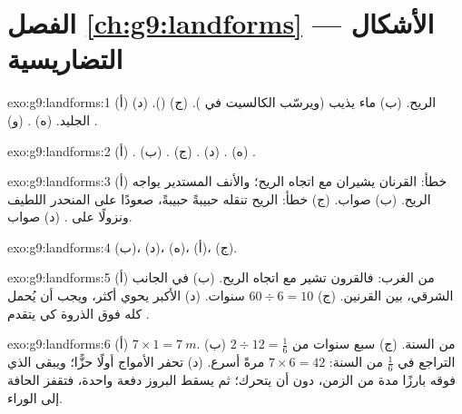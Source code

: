 \section*{الفصل \ref{ch:g9:landforms} --- الأشكال التضاريسية}

\begin{solution}{exo:g9:landforms:1}
(أ) الريح. (ب) ماء يذيب  (ويرسّب الكالسيت في ). (ج) 
(). (د) الجليد. (ه) . (و) .
\end{solution}

\begin{solution}{exo:g9:landforms:2}
(أ) . (ب) . (ج) . (د) .
(ه) .
\end{solution}

\begin{solution}{exo:g9:landforms:3}
(أ) خطأ: القرنان يشيران مع اتجاه الريح؛ والأنف المستدير يواجه الريح.
(ب) صواب. (ج) خطأ: الريح تنقله حبيبةً حبيبةً، صعودًا على المنحدر اللطيف
ونزولًا على . (د) صواب.
\end{solution}

\begin{solution}{exo:g9:landforms:4}
(ب)، (د)، (ه)، (أ)، (ج).
\end{solution}

\begin{solution}{exo:g9:landforms:5}
(أ) من الغرب: فالقرون تشير مع اتجاه الريح. (ب) في الجانب الشرقي، بين
القرنين. (ج) $60 \div 6 = 10$ سنوات. (د)  الأكبر يحوي  أكثر،
ويجب أن يُحمل كله فوق الذروة كي يتقدم
.
\end{solution}

\begin{solution}{exo:g9:landforms:6}
(أ) $7 \times 1 = \qty{7}{m}$. (ب) $2 \div 12 = \frac{1}{6}$ من السنة.
(ج) سبع سنوات من التراجع في $\frac{1}{6}$ من السنة: $7 \times 6 = 42$
مرةً أسرع. (د) تحفر الأمواج أولًا حزًّا؛ ويبقى  الذي فوقه بارزًا مدة
من الزمن، دون أن يتحرك؛ ثم يسقط البروز دفعة واحدة، فتقفز الحافة إلى
الوراء.
\end{solution}

